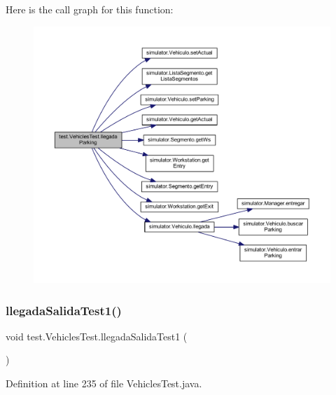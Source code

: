 Here is the call graph for this function\+:\nopagebreak
\begin{figure}[H]
\begin{center}
\leavevmode
\includegraphics[width=350pt]{classtest_1_1_vehicles_test_a9b90c693ab518856b021096cefde1e73_cgraph}
\end{center}
\end{figure}
\mbox{\label{classtest_1_1_vehicles_test_af6b183cd52a3b39d3e565d3e92a85487}} 
\subsubsection{\texorpdfstring{llegada\+Salida\+Test1()}{llegadaSalidaTest1()}}
{\footnotesize\ttfamily void test.\+Vehicles\+Test.\+llegada\+Salida\+Test1 (\begin{DoxyParamCaption}{ }\end{DoxyParamCaption})}



Definition at line 235 of file Vehicles\+Test.\+java.

